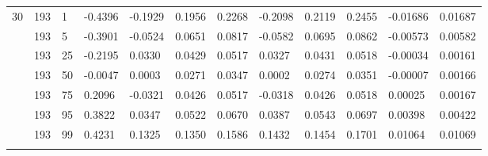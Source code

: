 \begin{longtable}{llllllllllll}
30 & 193 & 1 & -0.4396 & -0.1929 & 0.1956 & 0.2268 & -0.2098 & 0.2119 & 0.2455 & -0.01686 & 0.01687 \\ \addlinespace[3pt]
30 & 193 & 5 & -0.3901 & -0.0524 & 0.0651 & 0.0817 & -0.0582 & 0.0695 & 0.0862 & -0.00573 & 0.00582 \\ \addlinespace[3pt]
30 & 193 & 25 & -0.2195 & 0.0330 & 0.0429 & 0.0517 & 0.0327 & 0.0431 & 0.0518 & -0.00034 & 0.00161 \\ \addlinespace[3pt]
30 & 193 & 50 & -0.0047 & 0.0003 & 0.0271 & 0.0347 & 0.0002 & 0.0274 & 0.0351 & -0.00007 & 0.00166 \\ \addlinespace[3pt]
30 & 193 & 75 & 0.2096 & -0.0321 & 0.0426 & 0.0517 & -0.0318 & 0.0426 & 0.0518 & 0.00025 & 0.00167 \\ \addlinespace[3pt]
30 & 193 & 95 & 0.3822 & 0.0347 & 0.0522 & 0.0670 & 0.0387 & 0.0543 & 0.0697 & 0.00398 & 0.00422 \\ \addlinespace[3pt]
30 & 193 & 99 & 0.4231 & 0.1325 & 0.1350 & 0.1586 & 0.1432 & 0.1454 & 0.1701 & 0.01064 & 0.01069 \\ \addlinespace[3pt]
\bottomrule\end{longtable}
